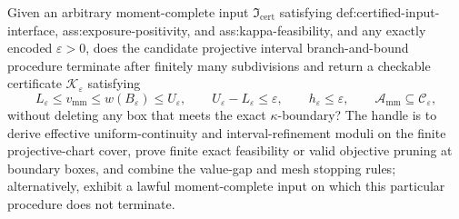 Given an arbitrary moment-complete input \(\mathfrak I_{\mathrm{cert}}\) satisfying def:certified-input-interface, ass:exposure-positivity, and ass:kappa-feasibility, and any exactly encoded \(\varepsilon>0\), does the candidate projective interval branch-and-bound procedure terminate after finitely many subdivisions and return a checkable certificate \(\mathscr K_{\varepsilon}\) satisfying
\[
L_{\varepsilon}\le v_{\mathrm{mm}}\le w(B_{\varepsilon})\le U_{\varepsilon},
\qquad
U_{\varepsilon}-L_{\varepsilon}\le\varepsilon,
\qquad
h_{\varepsilon}\le\varepsilon,
\qquad
\mathcal A_{\mathrm{mm}}\subseteq\mathcal C_{\varepsilon},
\]
without deleting any box that meets the exact \(\kappa\)-boundary?  The handle is to derive effective uniform-continuity and interval-refinement moduli on the finite projective-chart cover, prove finite exact feasibility or valid objective pruning at boundary boxes, and combine the value-gap and mesh stopping rules; alternatively, exhibit a lawful moment-complete input on which this particular procedure does not terminate.
